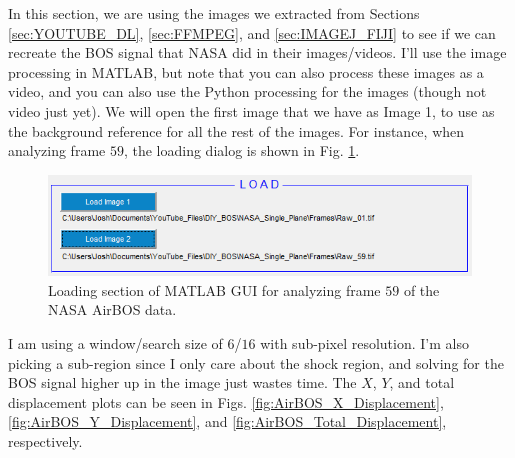 \documentclass[letterpaper,12pt]{article}
\begin{document}
In this section, we are using the images we extracted from Sections \ref{sec:YOUTUBE_DL}, \ref{sec:FFMPEG}, and \ref{sec:IMAGEJ_FIJI} to see if we can recreate the BOS signal that NASA did in their images/videos.  I'll use the image processing in MATLAB, but note that you can also process these images as a video, and you can also use the Python processing for the images (though not video just yet).  We will open the first image that we have as Image 1, to use as the background reference for all the rest of the images.  For instance, when analyzing frame $59$, the loading dialog is shown in Fig. \ref{fig:NASA_AirBOS_Load}.

\begin{figure}[h]
    \centering
    \includegraphics[width=0.75\linewidth]{NASA_AirBOS_Load.PNG}
    \caption{Loading section of MATLAB GUI for analyzing frame $59$ of the NASA AirBOS data.}
    \label{fig:NASA_AirBOS_Load}
\end{figure}

I am using a window/search size of $6$/$16$ with sub-pixel resolution.  I'm also picking a sub-region since I only care about the shock region, and solving for the BOS signal higher up in the image just wastes time.  The $X$, $Y$, and total displacement plots can be seen in Figs. \ref{fig:AirBOS_X_Displacement}, \ref{fig:AirBOS_Y_Displacement}, and \ref{fig:AirBOS_Total_Displacement}, respectively.
\end{document}
